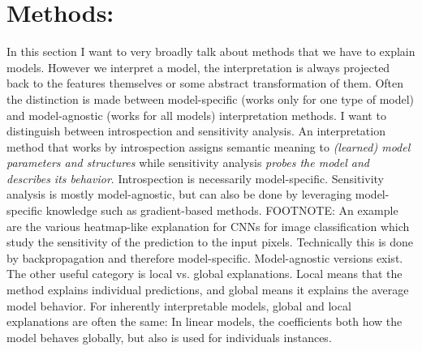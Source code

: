 \documentclass[runningheads]{llncs}
\begin{document}
\section{Methods:}

In this section I want to very broadly talk about methods that we have to explain models.
However we interpret a model, the interpretation is always projected back to the features themselves or some abstract transformation of them.
Often the distinction is made between model-specific (works only for one type of model) and model-agnostic (works for all models) interpretation methods.
I want to distinguish between introspection and sensitivity analysis.
An interpretation method that works by introspection assigns semantic meaning to \textit{(learned) model parameters and structures} while sensitivity analysis \textit{probes the model and describes its behavior}.
Introspection is necessarily model-specific.
Sensitivity analysis is mostly model-agnostic, but can also be done by leveraging model-specific knowledge such as gradient-based methods. FOOTNOTE: An example are the various heatmap-like explanation for CNNs for image classification \cite{sundararajan2017axiomatic,lundberg2017unified,montavon2017explaining,simonyan2013deep,shrikumar2016not} which study the sensitivity of the prediction to the input pixels. Technically this is done by backpropagation and therefore model-specific. Model-agnostic versions \cite{ribeiro2016should,lundberg2017unified,zeiler2014visualizing} exist.
The other useful category is local vs. global explanations.
Local means that the method explains individual predictions, and global means it explains the average model behavior.
For inherently interpretable models, global and local explanations are often the same: In linear models, the coefficients both how the model behaves globally, but also is used for individuals instances.
\end{document}
